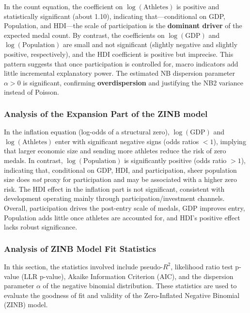 \documentclass[11pt,twoside]{article}
\numberwithin{Theorem}{section}
\numberwithin{Definition}{section}
\numberwithin{Lemma}{section}
\numberwithin{Algorithm}{section}
\numberwithin{equation}{section}
\begin{document}
In the count equation, the coefficient on $\log(\mathrm{Athletes})$ is positive and statistically significant (about 1.10), indicating that---conditional on GDP, Population, and HDI---the scale of participation is the \textbf{dominant driver} of the expected medal count. By contrast, the coefficients on $\log(\mathrm{GDP})$ and $\log(\mathrm{Population})$ are small and not significant (slightly negative and slightly positive, respectively), and the HDI coefficient is positive but imprecise. This pattern suggests that once participation is controlled for, macro indicators add little incremental explanatory power. The estimated NB dispersion parameter $\alpha>0$ is significant, confirming \textbf{overdispersion} and justifying the NB2 variance instead of Poisson.


\subsubsection{Analysis of the Expansion Part of the ZINB model}

In the inflation equation (log-odds of a structural zero), $\log(\mathrm{GDP})$ and $\log(\mathrm{Athletes})$ enter with significant negative signs (odds ratios $<1$), implying that larger economic size and sending more athletes reduce the risk of zero medals. In contrast, $\log(\mathrm{Population})$ is significantly positive (odds ratio $>1$), indicating that, conditional on GDP, HDI, and participation, sheer population size does \emph{not} proxy for participation and may be associated with a higher zero risk. The HDI effect in the inflation part is not significant, consistent with development operating mainly through participation/investment channels. Overall, participation drives the post-entry scale of medals, GDP improves entry, Population adds little once athletes are accounted for, and HDI’s positive effect lacks robust significance.




\subsubsection{Analysis of ZINB Model Fit Statistics}
\label{subsubsec:zinb-model-fit}

In this section, the statistics involved include pseudo-\( R^2 \), likelihood ratio test p-value (LLR p-value), Akaike Information Criterion (AIC), and the dispersion parameter \(\alpha\) of the negative binomial distribution. These statistics are used to evaluate the goodness of fit and validity of the Zero-Inflated Negative Binomial (ZINB) model.
\end{document}
